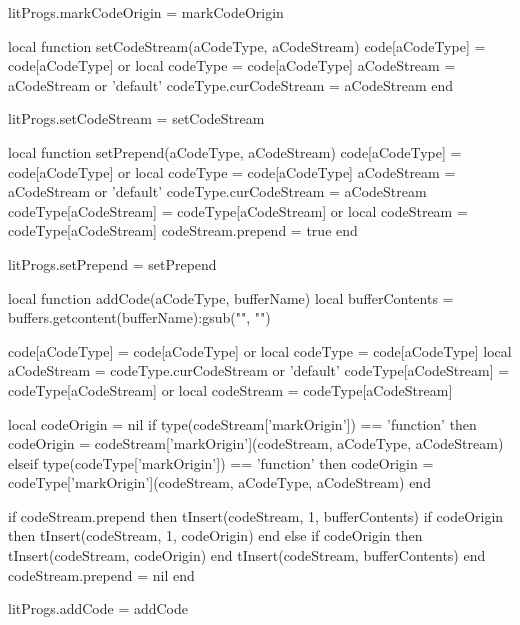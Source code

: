 litProgs.markCodeOrigin = markCodeOrigin

local function setCodeStream(aCodeType, aCodeStream)
  code[aCodeType]        = code[aCodeType] or { }
  local codeType         = code[aCodeType]
  aCodeStream            = aCodeStream or 'default'
  codeType.curCodeStream = aCodeStream
end

litProgs.setCodeStream = setCodeStream

local function setPrepend(aCodeType, aCodeStream)
  code[aCodeType]        = code[aCodeType] or { }
  local codeType         = code[aCodeType]
  aCodeStream            = aCodeStream or 'default'
  codeType.curCodeStream = aCodeStream
  codeType[aCodeStream]  = codeType[aCodeStream] or { }
  local codeStream       = codeType[aCodeStream]
  codeStream.prepend     = true
end

litProgs.setPrepend = setPrepend

local function addCode(aCodeType, bufferName)
  local bufferContents  =
    buffers.getcontent(bufferName):gsub("", "\n")

  code[aCodeType]       = code[aCodeType] or { }
  local codeType        = code[aCodeType]
  local aCodeStream     = codeType.curCodeStream or 'default'
  codeType[aCodeStream] = codeType[aCodeStream] or { }
  local codeStream      = codeType[aCodeStream]

  local codeOrigin      = nil
    if type(codeStream['markOrigin']) == 'function' then
      codeOrigin =
        codeStream['markOrigin'](codeStream, aCodeType, aCodeStream)
    elseif type(codeType['markOrigin']) == 'function' then
      codeOrigin =
        codeType['markOrigin'](codeStream, aCodeType, aCodeStream)
    end

  if codeStream.prepend then
    tInsert(codeStream, 1, bufferContents)
    if codeOrigin then 
      tInsert(codeStream, 1, codeOrigin)
    end
  else
    if codeOrigin then
      tInsert(codeStream, codeOrigin)
    end
    tInsert(codeStream, bufferContents)
  end
  codeStream.prepend = nil
end

litProgs.addCode = addCode
\stopLuaCode

\startMkIVCode
\unexpanded\def\setLitProgsOriginMarker{%
  \dotripleempty\doSetLitProgsOriginMarker%
}

\unexpanded{}
\stopMkIVCode

